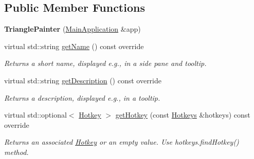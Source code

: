 \subsection*{Public Member Functions}
\begin{DoxyCompactItemize}
\item 
\mbox{\label{classpepr3d_1_1_triangle_painter_a960c0d36b0d8bd8eb9b1f18876894b7b}} 
{\bfseries Triangle\+Painter} (\mbox{\hyperlink{classpepr3d_1_1_main_application}{Main\+Application}} \&app)
\item 
\mbox{\label{classpepr3d_1_1_triangle_painter_a4064f4e3d370d72b13c16f8ed08207f2}} 
virtual std\+::string \mbox{\hyperlink{classpepr3d_1_1_triangle_painter_a4064f4e3d370d72b13c16f8ed08207f2}{get\+Name}} () const override
\begin{DoxyCompactList}\small\item\em Returns a short name, displayed e.\+g., in a side pane and tooltip. \end{DoxyCompactList}\item 
\mbox{\label{classpepr3d_1_1_triangle_painter_aeed99d15de0444336f86520bd1b6a360}} 
virtual std\+::string \mbox{\hyperlink{classpepr3d_1_1_triangle_painter_aeed99d15de0444336f86520bd1b6a360}{get\+Description}} () const override
\begin{DoxyCompactList}\small\item\em Returns a description, displayed e.\+g., in a tooltip. \end{DoxyCompactList}\item 
\mbox{\label{classpepr3d_1_1_triangle_painter_ad5d98e4a492606bd59c36cc2b319d0fb}} 
virtual std\+::optional$<$ \mbox{\hyperlink{structpepr3d_1_1_hotkey}{Hotkey}} $>$ \mbox{\hyperlink{classpepr3d_1_1_triangle_painter_ad5d98e4a492606bd59c36cc2b319d0fb}{get\+Hotkey}} (const \mbox{\hyperlink{classpepr3d_1_1_hotkeys}{Hotkeys}} \&hotkeys) const override
\begin{DoxyCompactList}\small\item\em Returns an associated \mbox{\hyperlink{structpepr3d_1_1_hotkey}{Hotkey}} or an empty value. Use hotkeys.\+find\+Hotkey() method. \end{DoxyCompactList}\item 
\mbox{\label{classpepr3d_1_1_triangle_painter_a4c63bae3ec3f2d909ea4f4ae1fa61d33}} 

\end{DoxyCompactItemize}
